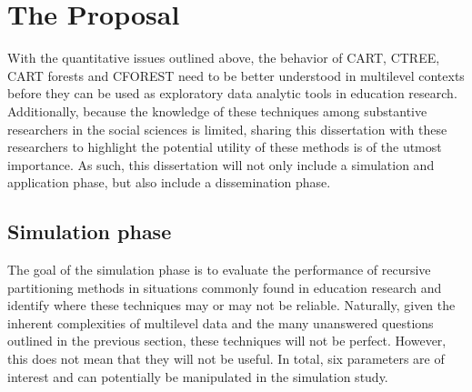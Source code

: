 
\chapter{The Proposal} %

\label{ch:proposal} %

With the quantitative issues outlined above, the behavior of CART, CTREE, CART forests and CFOREST need to be better understood in multilevel contexts before they can be used as exploratory data analytic tools in education research. Additionally, because the knowledge of these techniques among substantive researchers in the social sciences is limited, sharing this dissertation with these researchers to highlight the potential utility of these methods is of the utmost importance. As such, this dissertation will not only include a simulation and application phase, but also include a dissemination phase. 



\section{Simulation phase}

The goal of the simulation phase is to evaluate the performance of recursive partitioning methods in situations commonly found in education research and identify where these techniques may or may not be reliable. Naturally, given the inherent complexities of multilevel data and the many unanswered questions outlined in the previous section, these techniques will not be perfect. However, this does not mean that they will not be useful. In total, six parameters are of interest and can potentially be manipulated in the simulation study.



